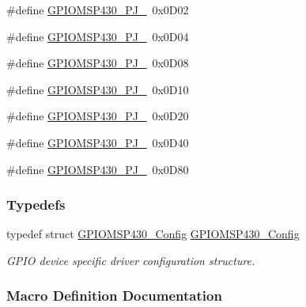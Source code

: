 \begin{DoxyCompactItemize}
\item 
\#define \hyperlink{_g_p_i_o_m_s_p430_8h_a829abc2ef4f55226ee8214eef4f1c665}{G\+P\+I\+O\+M\+S\+P430\+\_\+\+P\+J\+\_}~0x0\+D02
\item 
\#define \hyperlink{_g_p_i_o_m_s_p430_8h_ab77114e41c40eed271af416b86d3492f}{G\+P\+I\+O\+M\+S\+P430\+\_\+\+P\+J\+\_}~0x0\+D04
\item 
\#define \hyperlink{_g_p_i_o_m_s_p430_8h_a4fa6c71712a8e9f43d22247203861bf2}{G\+P\+I\+O\+M\+S\+P430\+\_\+\+P\+J\+\_}~0x0\+D08
\item 
\#define \hyperlink{_g_p_i_o_m_s_p430_8h_a713922efde97895ee9d01748a2684885}{G\+P\+I\+O\+M\+S\+P430\+\_\+\+P\+J\+\_}~0x0\+D10
\item 
\#define \hyperlink{_g_p_i_o_m_s_p430_8h_a7e6573d7d2a6dae96feb8d8cb0a93e9f}{G\+P\+I\+O\+M\+S\+P430\+\_\+\+P\+J\+\_}~0x0\+D20
\item 
\#define \hyperlink{_g_p_i_o_m_s_p430_8h_aba56b6abb4ec764156e1fdb3713e1771}{G\+P\+I\+O\+M\+S\+P430\+\_\+\+P\+J\+\_}~0x0\+D40
\item 
\#define \hyperlink{_g_p_i_o_m_s_p430_8h_aba5f8e331f0492122bd90a6661551c6f}{G\+P\+I\+O\+M\+S\+P430\+\_\+\+P\+J\+\_}~0x0\+D80
\end{DoxyCompactItemize}
\subsubsection*{Typedefs}
\begin{DoxyCompactItemize}
\item 
typedef struct \hyperlink{struct_g_p_i_o_m_s_p430___config}{G\+P\+I\+O\+M\+S\+P430\+\_\+\+Config} \hyperlink{_g_p_i_o_m_s_p430_8h_a75e3910032d3d00d96abcd64788c2d07}{G\+P\+I\+O\+M\+S\+P430\+\_\+\+Config}
\begin{DoxyCompactList}\small\item\em G\+P\+I\+O device specific driver configuration structure. \end{DoxyCompactList}\end{DoxyCompactItemize}


\subsubsection{Macro Definition Documentation}
